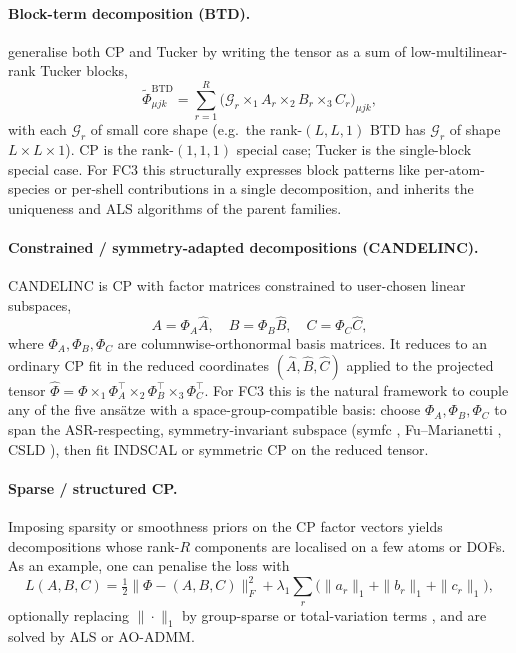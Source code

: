 \paragraph{Block-term decomposition (BTD).} \citet{de_lathauwer_decompositions_2008, de_lathauwer_decompositions_2008-1}
generalise both CP and Tucker by writing the tensor as a sum of low-multilinear-rank Tucker blocks,
\begin{equation}
  \tilde\Phi_{\mu j k}^{\mathrm{BTD}}
  = \sum_{r=1}^{R}\bigl(\mathcal{G}_r\times_1 A_r\times_2 B_r\times_3 C_r\bigr)_{\mu j k},
\end{equation}
with each $\mathcal{G}_r$ of small core shape (e.g.\ the rank-$(L,L,1)$ BTD has
$\mathcal{G}_r$ of shape $L\times L\times 1$). CP is the rank-$(1,1,1)$ special case; Tucker is
the single-block special case. For FC3 this structurally expresses block patterns like
per-atom-species or per-shell contributions in a single decomposition, and inherits the
uniqueness and ALS algorithms of the parent families.

\paragraph{Constrained / symmetry-adapted decompositions (CANDELINC).} CANDELINC
\cite{douglas_carroll_candelinc_1980} is CP with factor matrices constrained to user-chosen
linear subspaces,
\begin{equation}
  A=\Phi_A\hat A,\quad B=\Phi_B\hat B,\quad C=\Phi_C\hat C,
\end{equation}
where $\Phi_A,\Phi_B,\Phi_C$ are columnwise-orthonormal basis matrices. It reduces to an ordinary
CP fit in the reduced coordinates $(\hat A,\hat B,\hat C)$ applied to the projected tensor
$\hat\Phi = \Phi\times_1\Phi_A^\top\times_2\Phi_B^\top\times_3\Phi_C^\top$. For FC3 this is the
natural framework to couple any of the five ans\"atze with a space-group-compatible basis:
choose $\Phi_A,\Phi_B,\Phi_C$ to span the ASR-respecting, symmetry-invariant subspace (symfc
\cite{seko_projector-based_2024}, Fu--Marianetti \cite{fu_group_2019}, CSLD
\cite{zhou_lattice_2014, zhou_compressive_2019}), then fit INDSCAL or symmetric CP on the reduced
tensor.

\paragraph{Sparse / structured CP.} Imposing sparsity or smoothness priors on the CP factor
vectors yields decompositions whose rank-$R$ components are localised on a few atoms or DOFs.
As an example, one can penalise the loss with
\begin{equation}
  L(A,B,C) = \tfrac12\|\Phi - ( A,B,C)\|_{F}^{2}
            + \lambda_1\sum_r\bigl(\|a_r\|_1+\|b_r\|_1+\|c_r\|_1\bigr),
\end{equation}
optionally replacing $\|\cdot\|_1$ by group-sparse or total-variation terms
\cite{papalexakis_parcube_2012, kim_sparse_2007}, and are solved by
ALS or AO-ADMM.

